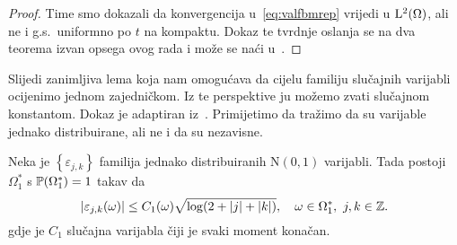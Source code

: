 \documentclass[main.tex]{subfiles}
\begin{document}
\begin{proof}
	Time smo dokazali da konvergencija u~\eqref{eq:valfbmrep} vrijedi u \( \L^2(\Omega) \), ali ne i g.s.\ uniformno po \( t \) na kompaktu. Dokaz te tvrdnje oslanja
	se na dva teorema izvan opsega ovog rada i može se naći u~\cite[tm.~3.15]{ayache}.

\end{proof}

Slijedi zanimljiva lema koja nam
omogućava da cijelu familiju slučajnih varijabli
ocijenimo jednom zajedničkom. Iz te perspektive
ju možemo zvati slučajnom konstantom.
Dokaz je adaptiran iz~\cite[str~459.]{jourfa-ayache}.
Primijetimo da tražimo da su varijable jednako distribuirane,
ali ne i da su nezavisne.

\begin{lema}
	Neka je \( \left\{ \varepsilon_{j,k} \right\} \) familija jednako distribuiranih
	\( \mathrm N(0,1) \) varijabli. Tada postoji \( \Omega_1^* \) s \( \P(\Omega_1^*) = 1 \)
	takav da
	\begin{equation}
		\abs{\varepsilon_{j,k}(\omega)} \le C_1(\omega) \sqrt{\log(2 + \abs j + \abs k)}
		,\quad \omega \in \Omega_1^*, \ j,k \in \Z.
	\end{equation}
	gdje je \( C_1  \) slučajna varijabla čiji je svaki moment konačan.
\end{lema}
\end{document}
